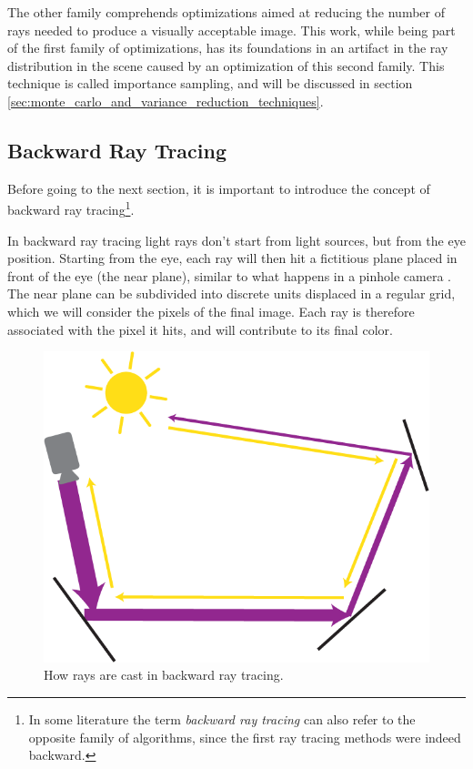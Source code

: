 \documentclass{PoliMi_MasterThesis}
\begin{document}
The other family comprehends optimizations aimed at reducing the number of rays needed to produce a visually acceptable image. This work, while being part of the first family of optimizations, has its foundations in an artifact in the ray distribution in the scene caused by an optimization of this second family. This technique is called importance sampling, and will be discussed in section \ref{sec:monte_carlo_and_variance_reduction_techniques}.

\subsection{Backward Ray Tracing}
Before going to the next section, it is important to introduce the concept of backward ray tracing\footnote{In some literature the term \textit{backward ray tracing} can also refer to the opposite family of algorithms, since the first ray tracing methods were indeed backward.}. 

In backward ray tracing light rays don't start from light sources, but from the eye position. Starting from the eye, each ray will then hit a fictitious plane placed in front of the eye (the near plane), similar to what happens in a pinhole camera \cite{pinhole_camera}. The near plane can be subdivided into discrete units displaced in a regular grid, which we will consider the pixels of the final image. Each ray is therefore associated with the pixel it hits, and will contribute to its final color.

\begin{figure}[H]
    \centering
    \includegraphics[width=\textwidth*\real{0.4}]{Images/backward_ray_tracing.png}
    \caption{How rays are cast in backward ray tracing.}
    \label{fig:pinhole_camera}
\end{figure}
\end{document}
